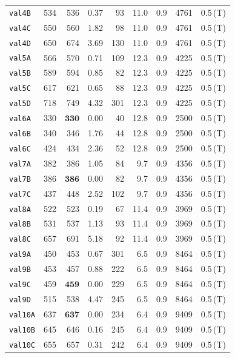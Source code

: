\begin{longtable}{lrrrrrrrl}
\texttt{val4B} & 534 & 536 & 0.37 & 93 & 11.0 & 0.9 & 4761 & 0.5\,(T) \\
\texttt{val4C} & 550 & 560 & 1.82 & 98 & 11.0 & 0.9 & 4761 & 0.5\,(T) \\
\texttt{val4D} & 650 & 674 & 3.69 & 130 & 11.0 & 0.9 & 4761 & 0.5\,(T) \\
\texttt{val5A} & 566 & 570 & 0.71 & 109 & 12.3 & 0.9 & 4225 & 0.5\,(T) \\
\texttt{val5B} & 589 & 594 & 0.85 & 82 & 12.3 & 0.9 & 4225 & 0.5\,(T) \\
\texttt{val5C} & 617 & 621 & 0.65 & 88 & 12.3 & 0.9 & 4225 & 0.5\,(T) \\
\texttt{val5D} & 718 & 749 & 4.32 & 301 & 12.3 & 0.9 & 4225 & 0.5\,(T) \\
\texttt{val6A} & 330 & $\mathbf{330}$ & 0.00 & 40 & 12.8 & 0.9 & 2500 & 0.5\,(T) \\
\texttt{val6B} & 340 & 346 & 1.76 & 44 & 12.8 & 0.9 & 2500 & 0.5\,(T) \\
\texttt{val6C} & 424 & 434 & 2.36 & 52 & 12.8 & 0.9 & 2500 & 0.5\,(T) \\
\texttt{val7A} & 382 & 386 & 1.05 & 84 & 9.7 & 0.9 & 4356 & 0.5\,(T) \\
\texttt{val7B} & 386 & $\mathbf{386}$ & 0.00 & 82 & 9.7 & 0.9 & 4356 & 0.5\,(T) \\
\texttt{val7C} & 437 & 448 & 2.52 & 102 & 9.7 & 0.9 & 4356 & 0.5\,(T) \\
\texttt{val8A} & 522 & 523 & 0.19 & 67 & 11.4 & 0.9 & 3969 & 0.5\,(T) \\
\texttt{val8B} & 531 & 537 & 1.13 & 93 & 11.4 & 0.9 & 3969 & 0.5\,(T) \\
\texttt{val8C} & 657 & 691 & 5.18 & 92 & 11.4 & 0.9 & 3969 & 0.5\,(T) \\
\texttt{val9A} & 450 & 453 & 0.67 & 301 & 6.5 & 0.9 & 8464 & 0.5\,(T) \\
\texttt{val9B} & 453 & 457 & 0.88 & 222 & 6.5 & 0.9 & 8464 & 0.5\,(T) \\
\texttt{val9C} & 459 & $\mathbf{459}$ & 0.00 & 229 & 6.5 & 0.9 & 8464 & 0.5\,(T) \\
\texttt{val9D} & 515 & 538 & 4.47 & 245 & 6.5 & 0.9 & 8464 & 0.5\,(T) \\
\texttt{val10A} & 637 & $\mathbf{637}$ & 0.00 & 234 & 6.4 & 0.9 & 9409 & 0.5\,(T) \\
\texttt{val10B} & 645 & 646 & 0.16 & 245 & 6.4 & 0.9 & 9409 & 0.5\,(T) \\
\texttt{val10C} & 655 & 657 & 0.31 & 242 & 6.4 & 0.9 & 9409 & 0.5\,(T) \\

\end{longtable}
